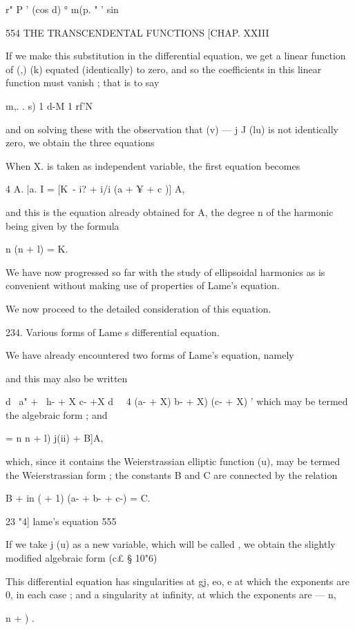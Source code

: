 {{{r" P '   (cos d) °  m(p. 
" ' sin 



554 THE TRANSCENDENTAL FUNCTIONS [CHAP. XXIII 

If we make this substitution in the differential equation, we get a linear 
function of (,) (k) equated (identically) to zero, and so the coefficients in this 
linear function must vanish ; that is to say 

m,. . s) 1 d-M 1 rf'N   

and on solving these with the observation that   (v) — j J (lu) is not identically 
zero, we obtain the three equations 

When X. is taken as independent variable, the first equation becomes 

4 A.  |a.  I = [K\ -  i? + i/i (a  + ¥ + c )] A, 

and this is the equation already obtained for A, the degree n of the harmonic 
being given by the formula 

n (n + l) = K. 

We have now progressed so far with the study of ellipsoidal harmonics as 
is convenient without making use of properties of Lame's equation. 

We now proceed to the detailed consideration of this equation. 

234. Various forms of Lame s differential equation. 

We have already encountered two forms of Lame's equation, namely 

and this may also be written 

d  \ a" + \ h- + X c- +X  d\ ~ 4 (a- + X)  b- + X) (c- + X) ' 
which may be termed the algebraic form ; and 

  =  n n + l) j(ii) + B]A, 

which, since it contains the Weierstrassian elliptic function  (u), may be 
termed the Weierstrassian form ; the constants B and C are connected by the 
relation 

B + in (  + 1) (a- + b- + c-) = C. 



23 "4] lame's equation 555 

If we take  j (u) as a new variable, which will be called  , we obtain the 
slightly modified algebraic form (c£ § 10"6) 

This differential equation has singularities at gj, eo, e  at which the 
exponents are 0,   in each case ; and a singularity at infinity, at which the 
exponents are — n,\ \ {n +  ) . 

}}}}
